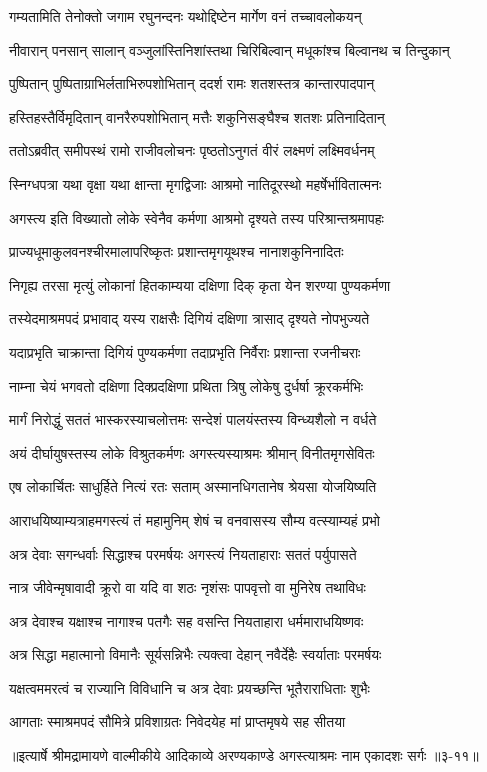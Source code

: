 \twolineshloka
{गम्यतामिति तेनोक्तो जगाम रघुनन्दनः}
{यथोद्दिष्टेन मार्गेण वनं तच्चावलोकयन्} %

\twolineshloka
{नीवारान् पनसान् सालान् वञ्जुलांस्तिनिशांस्तथा}
{चिरिबिल्वान् मधूकांश्च बिल्वानथ च तिन्दुकान्} %

\twolineshloka
{पुष्पितान् पुष्पिताग्राभिर्लताभिरुपशोभितान्}
{ददर्श रामः शतशस्तत्र कान्तारपादपान्} %

\twolineshloka
{हस्तिहस्तैर्विमृदितान् वानरैरुपशोभितान्}
{मत्तैः शकुनिसङ्घैश्च शतशः प्रतिनादितान्} %

\twolineshloka
{ततोऽब्रवीत् समीपस्थं रामो राजीवलोचनः}
{पृष्ठतोऽनुगतं वीरं लक्ष्मणं लक्ष्मिवर्धनम्} %

\twolineshloka
{स्निग्धपत्रा यथा वृक्षा यथा क्षान्ता मृगद्विजाः}
{आश्रमो नातिदूरस्थो महर्षेर्भावितात्मनः} %

\twolineshloka
{अगस्त्य इति विख्यातो लोके स्वेनैव कर्मणा}
{आश्रमो दृश्यते तस्य परिश्रान्तश्रमापहः} %

\twolineshloka
{प्राज्यधूमाकुलवनश्चीरमालापरिष्कृतः}
{प्रशान्तमृगयूथश्च नानाशकुनिनादितः} %

\twolineshloka
{निगृह्य तरसा मृत्युं लोकानां हितकाम्यया}
{दक्षिणा दिक् कृता येन शरण्या पुण्यकर्मणा} %

\twolineshloka
{तस्येदमाश्रमपदं प्रभावाद् यस्य राक्षसैः}
{दिगियं दक्षिणा त्रासाद् दृश्यते नोपभुज्यते} %

\twolineshloka
{यदाप्रभृति चाक्रान्ता दिगियं पुण्यकर्मणा}
{तदाप्रभृति निर्वैराः प्रशान्ता रजनीचराः} %

\twolineshloka
{नाम्ना चेयं भगवतो दक्षिणा दिक्प्रदक्षिणा}
{प्रथिता त्रिषु लोकेषु दुर्धर्षा क्रूरकर्मभिः} %

\twolineshloka
{मार्गं निरोद्धुं सततं भास्करस्याचलोत्तमः}
{सन्देशं पालयंस्तस्य विन्ध्यशैलो न वर्धते} %

\twolineshloka
{अयं दीर्घायुषस्तस्य लोके विश्रुतकर्मणः}
{अगस्त्यस्याश्रमः श्रीमान् विनीतमृगसेवितः} %

\twolineshloka
{एष लोकार्चितः साधुर्हिते नित्यं रतः सताम्}
{अस्मानधिगतानेष श्रेयसा योजयिष्यति} %

\twolineshloka
{आराधयिष्याम्यत्राहमगस्त्यं तं महामुनिम्}
{शेषं च वनवासस्य सौम्य वत्स्याम्यहं प्रभो} %

\twolineshloka
{अत्र देवाः सगन्धर्वाः सिद्धाश्च परमर्षयः}
{अगस्त्यं नियताहाराः सततं पर्युपासते} %

\twolineshloka
{नात्र जीवेन्मृषावादी क्रूरो वा यदि वा शठः}
{नृशंसः पापवृत्तो वा मुनिरेष तथाविधः} %

\twolineshloka
{अत्र देवाश्च यक्षाश्च नागाश्च पतगैः सह}
{वसन्ति नियताहारा धर्ममाराधयिष्णवः} %

\twolineshloka
{अत्र सिद्धा महात्मानो विमानैः सूर्यसन्निभैः}
{त्यक्त्वा देहान् नवैर्देहैः स्वर्याताः परमर्षयः} %

\twolineshloka
{यक्षत्वममरत्वं च राज्यानि विविधानि च}
{अत्र देवाः प्रयच्छन्ति भूतैराराधिताः शुभैः} %

\twolineshloka
{आगताः स्माश्रमपदं सौमित्रे प्रविशाग्रतः}
{निवेदयेह मां प्राप्तमृषये सह सीतया} %


॥इत्यार्षे श्रीमद्रामायणे वाल्मीकीये आदिकाव्ये अरण्यकाण्डे अगस्त्याश्रमः नाम एकादशः सर्गः ॥३-११॥
